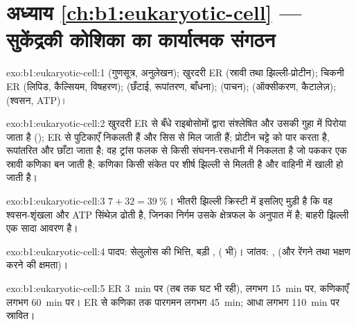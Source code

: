 \section*{अध्याय \ref{ch:b1:eukaryotic-cell} --- सुकेंद्रकी कोशिका का कार्यात्मक संगठन}

\begin{solution}{exo:b1:eukaryotic-cell:1}
 (गुणसूत्र, अनुलेखन); खुरदरी ER (स्रावी तथा झिल्ली-प्रोटीन);
चिकनी ER (लिपिड, कैल्सियम, विषहरण);  (छँटाई,
रूपांतरण, बाँधना);  (पाचन);  (ऑक्सीकरण,
कैटालेज़);  (श्वसन, ATP)।
\end{solution}

\begin{solution}{exo:b1:eukaryotic-cell:2}
खुरदरी ER से बँधे राइबोसोमों द्वारा संश्लेषित और उसकी गुहा में पिरोया
जाता है (); ER से पुटिकाएँ निकलती हैं और सिस
 से मिल जाती हैं; प्रोटीन चट्टे को पार करता है, रूपांतरित और छाँटा
जाता है; वह ट्रांस फलक से किसी संघनन-रसधानी में निकलता है जो पककर एक
स्रावी कणिका बन जाती है; कणिका किसी संकेत पर शीर्ष झिल्ली से मिलती है और
वाहिनी में खाली हो जाती है।
\end{solution}

\begin{solution}{exo:b1:eukaryotic-cell:3}
$7 + 32 = \qty{39}{\%}$। भीतरी झिल्ली क्रिस्टी में इसलिए मुड़ी है कि वह
श्वसन-शृंखला और ATP सिंथेज़ ढोती है, जिनका निर्गम उसके क्षेत्रफल के
अनुपात में है; बाहरी झिल्ली एक सादा आवरण है।
\end{solution}

\begin{solution}{exo:b1:eukaryotic-cell:4}
पादप: सेलुलोस की भित्ति, बड़ी ,  ( भी)।
जांतव: ,  (और रेंगने तथा भक्षण करने की
क्षमता)।
\end{solution}

\begin{solution}{exo:b1:eukaryotic-cell:5}
ER \qty{3}{min} पर (तब तक घट भी रही),  लगभग \qty{15}{min} पर,
कणिकाएँ लगभग \qty{60}{min} पर। ER से कणिका तक पारगमन लगभग
\qty{45}{min}; आधा लगभग \qty{110}{min} पर स्रावित।
\end{solution}


